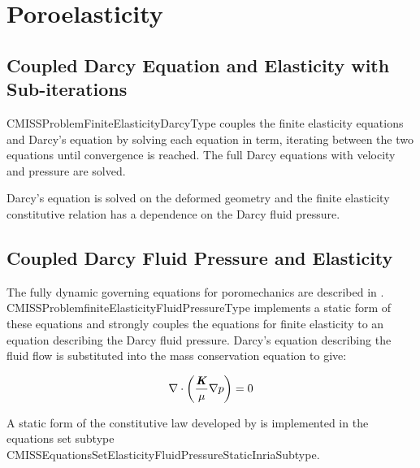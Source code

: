 \section{Poroelasticity}

\subsection{Coupled Darcy Equation and Elasticity with Sub-iterations}

CMISSProblemFiniteElasticityDarcyType couples the finite elasticity equations and
Darcy's equation by solving each equation in term, iterating between the two equations
until convergence is reached. The full Darcy equations with velocity and pressure
are solved.

Darcy's equation is solved on the deformed geometry and the finite elasticity
constitutive relation has a dependence on the Darcy fluid pressure.

\subsection{Coupled Darcy Fluid Pressure and Elasticity}

The fully dynamic governing equations for poromechanics are described in \citet{coussy:2004}.
CMISSProblemfiniteElasticityFluidPressureType implements a static form of these equations
and strongly couples the equations
for finite elasticity to an equation describing the Darcy fluid pressure. Darcy's
equation describing the fluid flow is substituted into the mass conservation
equation to give:

\begin{equation}
\divergence{}{\pbrac{\dfrac{\tensor{K}}{\mu} \gradient{}{p}}} = 0
\end{equation}

A static form of the constitutive law developed by \citet{chapelle:2010} is implemented in the equations
set subtype CMISSEquationsSetElasticityFluidPressureStaticInriaSubtype.
